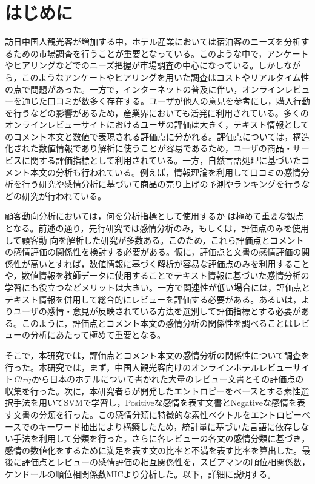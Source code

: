 \documentclass[review]{elsarticle}
\begin{document}
\begin{CJK}{UTF8}{min}
\begin{frontmatter}
\begin{keyword}
\end{keyword}

\end{frontmatter}

\section{はじめに}\label{intro}

訪日中国人観光客が増加する中，ホテル産業においては宿泊客のニーズを分析するための市場調査を行うことが重要となっている。このような中で，アンケートやヒアリングなどでのニーズ把握が市場調査の中心になっている。しかしながら，このようなアンケートやヒアリングを用いた調査はコストやリアルタイム性の点で問題があった。一方で，インターネットの普及に伴い，オンラインレビューを通じた口コミが数多く存在する。ユーザが他人の意見を参考にし，購入行動を行うなどの影響がある\cite[][]{VERMEULEN2009123, SPARKS20111310}ため，産業界においても活発に利用されている。多くのオンラインレビューサイトにおけるユーザの評価は大きく，テキスト情報としてのコメント本文と数値で表現される評価点に分かれる。評価点については，構造化された数値情報であり解析に使うことが容易であるため，ユーザの商品・サービスに関する評価指標として利用されている\cite[][]{XIE20141, BULCHANDGIDUMAL201344, ZHOU20141}。一方，自然言語処理に基づいたコメント本文の分析も行われている。例えば，情報理論を利用して口コミの感情分析を行う研究\cite[][]{AMPLAYO201754}や感情分析に基づいて商品の売り上げの予測\cite[][]{FAN201790}やランキング\cite[][]{LIU2017149}を行うなどの研究が行われている。

顧客動向分析においては，何を分析指標として使用するか は極めて重要な観点となる。前述の通り，先行研究では感情分析のみ\cite[][]{AMPLAYO201754,LIU2017149}，もしくは，評価点のみ\cite[][]{XIE20141, BULCHANDGIDUMAL201344, ZHOU20141}を使用して顧客動 向を解析した研究が多数ある。このため，これら評価点とコメントの感情評価の関係性を検討する必要がある。仮に，評価点と文書の感情評価の関係性が高いとすれば，数値情報に基づく解析が容易な評価点のみを利用することや，数値情報を教師データに使用することでテキスト情報に基づいた感情分析の学習にも役立つなどメリットは大きい。一方で関連性が低い場合には，評価点とテキスト情報を併用して総合的にレビューを評価する必要がある。あるいは，よりユーザの感情・意見が反映されている方法を選別して評価指標とする必要がある。このように，評価点とコメント本文の感情分析の関係性を調べることはレビューの分析にあたって極めて重要となる。

そこで，本研究では，評価点とコメント本文の感情分析の関係性について調査を行った。本研究では，まず，中国人観光客向けのオンラインホテルレビューサイト\textit{Ctrip}から日本のホテルについて書かれた大量のレビュー文書とその評価点の収集を行った。次に，本研究者らが開発したエントロピーをベースとする素性選択手法を用いてSVMで学習し，Positiveな感情を表す文書とNegativeな感情を表す文書の分類を行った。この感情分類に特徴的な素性ベクトルをエントロピーベースでのキーワード抽出により構築したため，統計量に基づいた言語に依存しない手法を利用して分類を行った。さらに各レビューの各文の感情分類に基づき，感情の数値化をするために満足を表す文の比率と不満を表す比率を算出した。最後に評価点とレビューの感情評価の相互関係性を，スピアマンの順位相関係数，ケンドールの順位相関係数MICより分析した。以下，詳細に説明する。



\end{CJK}
\end{document}
